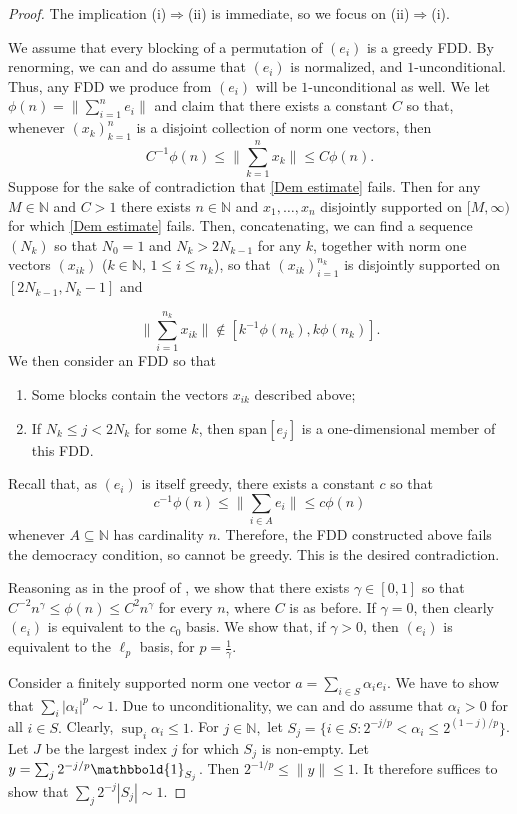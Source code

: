 \documentclass[12pt,leqno]{amsart}
\numberwithin{equation}{section}
\theoremstyle{definition}
\def\one{\mathbbold{1}}
\begin{document}
\begin{proof}
The implication (i)$\Rightarrow$(ii) is immediate, so we focus on (ii)$\Rightarrow$(i).
\medskip

We assume that every blocking of a permutation of $(e_i)$ is a greedy FDD.
By renorming, we can and do assume that $(e_i)$ is normalized, and $1$-unconditional.  Thus,  any FDD we produce from $(e_i)$ will be $1$-unconditional as well. We let $\phi(n)=\Big\|\sum_{i=1}^ne_i\Big\|$ and claim that there exists a constant $C$ so that, whenever $(x_k)_{k=1}^n$ is a disjoint collection of norm one vectors, then 
\begin{equation}\label{Dem estimate}
C^{-1}\phi(n)\leq \Big\|\sum_{k=1}^nx_k\Big\|\leq C\phi(n).\end{equation}
Suppose for the sake of contradiction that \eqref{Dem estimate} fails. Then for any $M\in \mathbb{N}$ and $C>1$ there exists $n\in \mathbb{N}$ and $x_1,\dots,x_n$ disjointly supported on $[M,\infty)$ for which \eqref{Dem estimate} fails. Then, concatenating, we can find a sequence $(N_k)$ so that $N_0=1$ and $N_k>2N_{k-1}$ for any $k$, together with norm one vectors $(x_{ik})$ ($k\in \mathbb{N}$, $1\leq i\leq n_k$), so that $(x_{ik})_{i=1}^{n_k}$ is disjointly supported on $[2N_{k-1},N_k-1]$ and

$$\Big\|\sum_{i=1}^{n_k}x_{ik}\Big\|\not\in [k^{-1}\phi(n_k),k\phi(n_k)].$$
We then consider an FDD so that
\begin{enumerate}
    \item Some blocks contain the vectors $x_{ik}$ described above;
    \item If $N_k\leq j<2N_k$ for some $k$, then span$[e_j]$ is a one-dimensional member of this FDD.
\end{enumerate}
Recall that, as $(e_i)$ is itself greedy, there exists a constant $c$ so that
$$c^{-1}\phi(n)\leq \Big\|\sum_{i\in A}e_i\Big\|\leq c\phi(n)$$
whenever $A\subseteq \mathbb{N}$ has cardinality $n$. Therefore, the FDD constructed above fails the democracy condition, so cannot be greedy. This is the desired contradiction.
\medskip

Reasoning as in the proof of \cite[Theorem 2.a.9]{LT1}, we show that there exists $\gamma\in [0,1]$ so that $C^{-2}n^\gamma\leq \phi(n)\leq C^2n^\gamma$ for every $n$, where $C$ is as before. If $\gamma=0$, then clearly $(e_i)$ is equivalent to the $c_0$ basis. We show that, if $\gamma>0$, then $(e_i)$ is equivalent to the $\ell_p$ basis, for $p=\frac{1}{\gamma}.$
\medskip

Consider a finitely supported norm one vector $a=\sum_{i\in S}\alpha_ie_i.$ We have to show that $\sum_i|\alpha_i|^p\sim 1.$ Due to unconditionality, we can and do assume that $\alpha_i>0$ for all $i\in S.$ Clearly, $\sup_i\alpha_i\leq 1$. For $j\in \mathbb{N},$ let $S_j=\{i\in S : 2^{-j/p}<\alpha_i\leq 2^{(1-j)/p}\}$. Let $J$ be the largest index $j$ for which $S_j$ is non-empty. Let $y=\sum_j2^{-j/p}\one_{S_j}$. Then $2^{-1/p}\leq \|y\|\leq 1$. It therefore suffices to show that $\sum_j 2^{-j}|S_j|\sim 1.$
\medskip


\end{proof}
\end{document}
